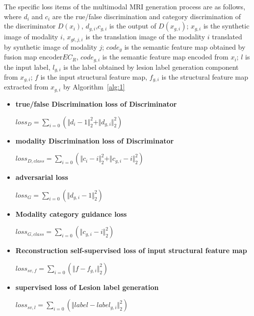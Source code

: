 \documentclass[letterpaper]{article} %
\begin{document}
The specific loss items of the multimodal MRI generation process are as follows, where $d_{i}$ and $c_{i}$ are the rue/false discrimination and category discrimination of the discriminator $D(x_i)$, $d_{g, i}$,$c_{g,i}$ is the output of $D(x_{g,i})$; $x_{g,i}$ is the synthetic image of modality $i$, $x_{gt,j,i}$ is the translation image of the modality $i$ translated by synthetic image of modality $j$; $code_g$ is the semantic feature map obtained by fusion map encoder$EC_R$, $code_{g,i}$ is the semantic feature map encoded from $x_i$; $l$ is the input label, $l_{g,i}$ is the label obtained by lesion label generation component from $x_{g,i}$; $f$ is the input structural feature map, $f_{g,i}$ is the structural feature map extracted from $x_{g,i}$ by Algorithm~\ref{alg:1}
\begin{itemize}
	\item \textbf{true/false Discrimination loss of Discriminator}
	\begin{center}
		$loss_{D}=\sum\limits_{i=0}(\Vert{d_{i}-1}\Vert_{2}^{2}+\Vert{d_{g,i}}\Vert_{2}^{2})$
	\end{center}

	\item \textbf{modality Discrimination loss of Discriminator}
	\begin{center}
	$loss_{D,class}=\sum\limits_{i=0}(\Vert{c_{i}-i}\Vert_{2}^{2}+\Vert{c_{g,i}-i}\Vert_{2}^{2})$
	\end{center}

	\item \textbf{adversarial loss}
	\begin{center}
		$loss_{G}=\sum\limits_{i=0}(\Vert{d_{g,i}-1}\Vert_{2}^{2})$
	\end{center}
	
	\item \textbf{Modality category guidance loss}
	\begin{center}
		$loss_{G,class}=\sum\limits_{i=0}(\Vert{c_{g,i}-i}\Vert_{2}^{2})$
	\end{center}
	
	\item \textbf{Reconstruction self-supervised loss of input structural feature map}
	\begin{center}
		$loss_{sv,f}=\sum\limits_{i=0}(\Vert{f-f_{g,i}}\Vert_{2}^{2})$
	\end{center}
	
	\item \textbf{supervised loss of Lesion label generation }
	\begin{center}
		$loss_{sv,l}=\sum\limits_{i=0}(\Vert{label-label_{g,i}}\Vert_{2}^{2})$
	\end{center}
	

\end{itemize}
\end{document}
